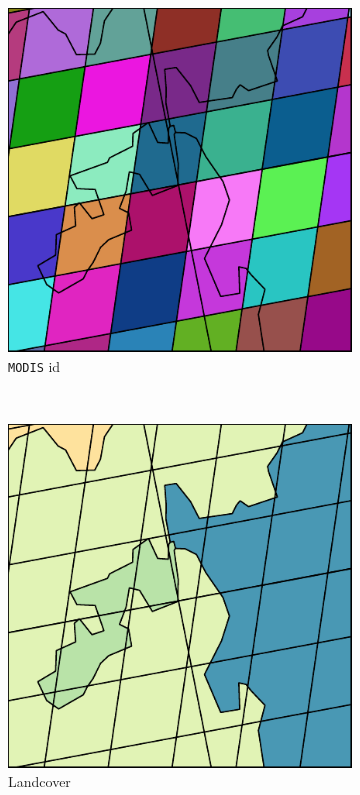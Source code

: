\documentclass[twoside,a4paper]{refart}
\begin{document}
\begin{description}
\begin{figure}
\label{fig:lcm}
        \centering
        \begin{subfigure}[b]{0.3\textwidth}
                \includegraphics[width=\textwidth]{thumbs/lcm_modis}
                \caption{\texttt{MODIS} id}
                \label{fig:lcm-mod}
        \end{subfigure}
        ~ 
        \begin{subfigure}[b]{0.3\textwidth}
                \includegraphics[width=\textwidth]{thumbs/lcm_landcover}
                \caption{Landcover}
                \label{fig:lcm-landcover}
        \end{subfigure}
        ~ 
        \begin{subfigure}[b]{0.3\textwidth}
        

\end{subfigure}
\end{figure}
\end{description}
\end{document}
